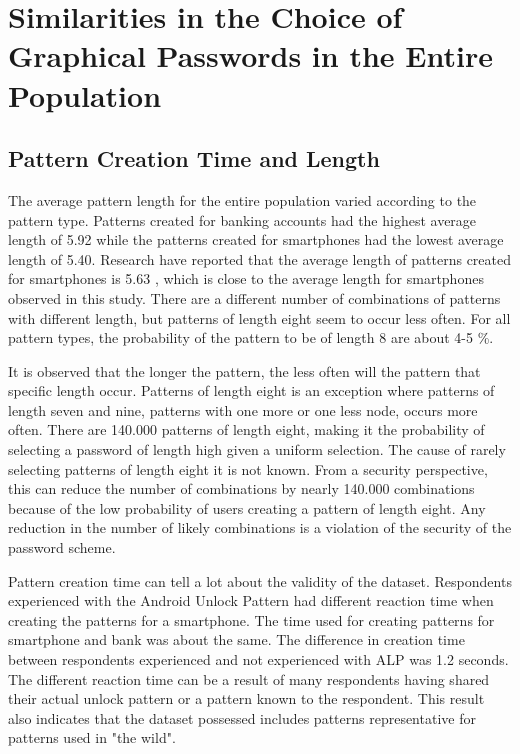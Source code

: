 
  \section{Similarities in the Choice of Graphical Passwords in the Entire Population}

    \subsection{Pattern Creation Time and Length}

      The average pattern length for the entire population varied according to the pattern type. Patterns created for banking accounts had the highest average length of 5.92 while the patterns created for smartphones had the lowest average length of 5.40. Research have reported that the average length of patterns created for smartphones is 5.63 \cite{Uellenbeck}, which is close to the average length for smartphones observed in this study. There are a different number of combinations of patterns with different length, but patterns of length eight seem to occur less often. For all pattern types, the probability of the pattern to be of length 8 are about 4-5 \%. 

      It is observed that the longer the pattern, the less often will the pattern that specific length occur. Patterns of length eight is an exception where patterns of length seven and nine, patterns with one more or one less node, occurs more often. There are 140.000 patterns of length eight, making it the probability of selecting a password of length high given a uniform selection. The cause of rarely selecting patterns of length eight it is not known. From a security perspective, this can reduce the number of combinations by nearly 140.000 combinations because of the low probability of users creating a pattern of length eight. Any reduction in the number of likely combinations is a violation of the security of the password scheme.

      Pattern creation time can tell a lot about the validity of the dataset. Respondents experienced with the Android Unlock Pattern had different reaction time when creating the patterns for a smartphone. The time used for creating patterns for smartphone and bank was about the same. The difference in creation time between respondents experienced and not experienced with ALP was 1.2 seconds. The different reaction time can be a result of many respondents having shared their actual unlock pattern or a pattern known to the respondent. This result also indicates that the dataset possessed includes patterns representative for patterns used in "the wild". 

